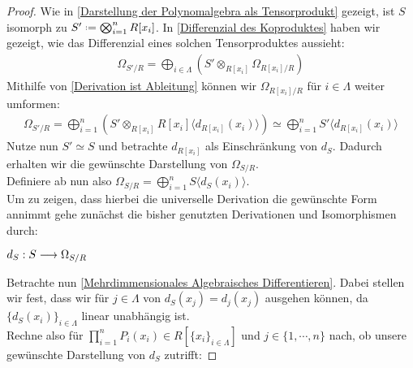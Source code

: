 \documentclass[10pt,a4paper]{report}
\newcommand{\functionfront}[3]{\nolinebreak{#1:#2 \longrightarrow #3}}
\newcommand{\divR}[2]{\Omega_{#1/#2}}
\newcommand{\divf}[1]{d_{#1}}
\newcommand{\Tensor}[3]{#1 \otimes_{#2} #3}
\newcommand{\tensor}[3]{#1 \otimes #3}
\newcommand*{\defeq}{\mathrel{\vcenter{\baselineskip0.5ex \lineskiplimit0pt
                     \hbox{\scriptsize.}\hbox{\scriptsize.}}}%
                     =}
\begin{document}
\begin{proof}
Wie in \cref{Darstellung der Polynomalgebra als Tensorprodukt} gezeigt, ist $S$ isomorph zu $S' \defeq \bigotimes_{i = 1}^n R[x_i]$. In \cref{Differenzial des Koproduktes} haben wir gezeigt, wie das Differenzial eines solchen Tensorproduktes aussieht:
\begin{gather*}
\divR{S'}{R} = \bigoplus_{i \in \Lambda} (\Tensor{S'}{R[x_i]}{\divR{R[x_i]}{R}})
\end{gather*}
Mithilfe von \cref{Derivation ist Ableitung} können wir ${\divR{R[x_i]}{R}}$ für $i \in \Lambda$ weiter umformen:
\begin{gather*}
\divR{S'}{R} = \bigoplus_{i = 1}^n (\Tensor{S'}{R[x_i]}{R[x_i]\langle \divf{R[x_i]}(x_i) \rangle})
\simeq \bigoplus_{i = 1}^n S' \langle \divf{R[x_i]}(x_i) \rangle 
\end{gather*}
Nutze nun $S' \simeq S$ und betrachte $\divf{R[x_i]}$ als Einschränkung von $\divf{S}$. Dadurch erhalten wir die gewünschte Darstellung von $\divR{S}{R}$.\\
Definiere ab nun also $\divR{S}{R} = \bigoplus_{i = 1}^n S \langle \divf{S}(x_i) \rangle$.\\
Um zu zeigen, dass hierbei die universelle Derivation die gewünschte Form annimmt gehe zunächst die bisher genutzten Derivationen und Isomorphismen durch:
\begin{center}
$\functionfront{\divf{S}}{S}{\divR{S}{R}}$
\end{center}
Betrachte nun \cref{Mehrdimmensionales Algebraisches Differentieren}. Dabei stellen wir fest, dass wir für $j \in \Lambda$ von $\divf{S}(x_j) = \divf{j}(x_j)$ ausgehen können, da $\lbrace \divf{S}(x_i) \rbrace_{i \in \Lambda}$ linear unabhängig ist.\\
Rechne also für $\prod_{i = 1}^n P_i(x_i) \in R[\lbrace x_i \rbrace_{i \in \Lambda}]$ und $j \in \lbrace 1, \cdots , n \rbrace$ nach, ob unsere gewünschte Darstellung von $\divf{S}$ zutrifft:

\end{proof}
\end{document}
